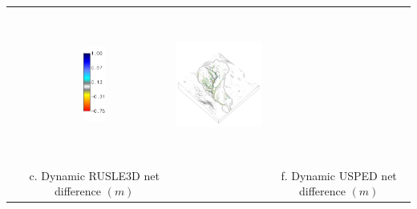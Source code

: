 \documentclass{standalone}
\begin{document}
\begin{tabular}{m{} m{} m{} m{}}
& \multicolumn{1}{c}{\includegraphics[height=25mm]{../../images/usped_3d/legend_difference.png}}
& \multicolumn{1}{c}{\includegraphics[height=50mm]{../../images/usped_3d/difference.png}}\\
\multicolumn{1}{c}{} 
& \multicolumn{1}{c}{c. Dynamic RUSLE3D net difference $(m)$}
& \multicolumn{1}{c}{} 
& \multicolumn{1}{c}{f. Dynamic USPED net difference $(m)$}\\

%
\end{tabular}

\end{document}

